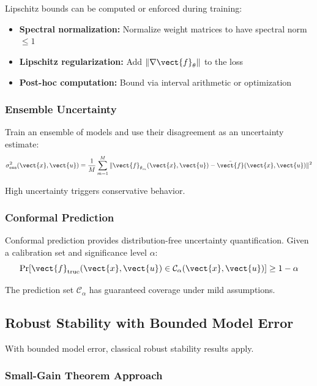 Lipschitz bounds can be computed or enforced during training:
\begin{itemize}
    \item \textbf{Spectral normalization:} Normalize weight matrices to have spectral norm $\leq 1$
    \item \textbf{Lipschitz regularization:} Add $\|\nabla \vect{f}_\theta\|$ to the loss
    \item \textbf{Post-hoc computation:} Bound via interval arithmetic or optimization
\end{itemize}

\subsubsection{Ensemble Uncertainty}

Train an ensemble of models and use their disagreement as an uncertainty estimate:
\begin{equation}
\sigma_{\text{ens}}^2(\vect{x}, \vect{u}) = \frac{1}{M}\sum_{m=1}^{M} \|\vect{f}_{\theta_m}(\vect{x}, \vect{u}) - \bar{\vect{f}}(\vect{x}, \vect{u})\|^2
\label{eq:ensemble_uncertainty}
\end{equation}

High uncertainty triggers conservative behavior.

\subsubsection{Conformal Prediction}

Conformal prediction provides distribution-free uncertainty quantification. Given a calibration set and significance level $\alpha$:
\begin{equation}
\Pr[\vect{f}_{\text{true}}(\vect{x}, \vect{u}) \in \mathcal{C}_\alpha(\vect{x}, \vect{u})] \geq 1 - \alpha
\label{eq:conformal_guarantee}
\end{equation}

The prediction set $\mathcal{C}_\alpha$ has guaranteed coverage under mild assumptions.

\subsection{Robust Stability with Bounded Model Error}

With bounded model error, classical robust stability results apply.

\subsubsection{Small-Gain Theorem Approach}

